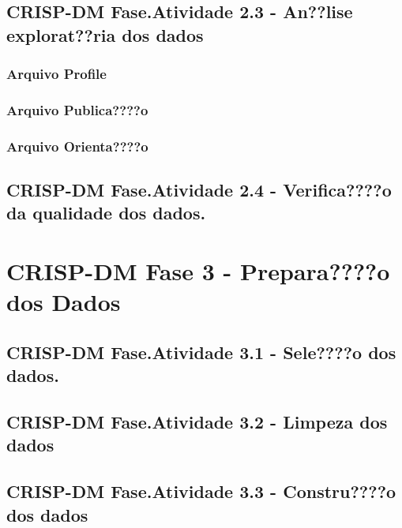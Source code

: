 \documentclass[]{article}
\begin{document}
\subsection{CRISP-DM Fase.Atividade 2.3 - An??lise explorat??ria dos
dados}\label{crisp-dm-fase.atividade-2.3---anlise-exploratria-dos-dados}

\subsubsection{Arquivo Profile}\label{arquivo-profile}

\subsubsection{Arquivo Publica????o}\label{arquivo-publicao}

\subsubsection{Arquivo Orienta????o}\label{arquivo-orientao}

\subsection{CRISP-DM Fase.Atividade 2.4 - Verifica????o da qualidade dos
dados.}\label{crisp-dm-fase.atividade-2.4---verificao-da-qualidade-dos-dados.}

\section{\texorpdfstring{CRISP-DM Fase 3 - \textbf{Prepara????o dos
Dados}}{CRISP-DM Fase 3 - Prepara????o dos Dados}}\label{crisp-dm-fase-3---preparao-dos-dados}

\subsection{CRISP-DM Fase.Atividade 3.1 - Sele????o dos
dados.}\label{crisp-dm-fase.atividade-3.1---seleo-dos-dados.}

\subsection{CRISP-DM Fase.Atividade 3.2 - Limpeza dos
dados}\label{crisp-dm-fase.atividade-3.2---limpeza-dos-dados}

\subsection{CRISP-DM Fase.Atividade 3.3 - Constru????o dos
dados}\label{crisp-dm-fase.atividade-3.3---construo-dos-dados}
\end{document}
